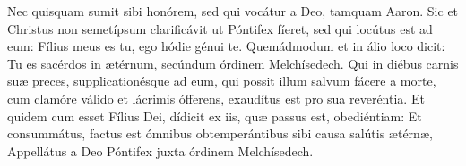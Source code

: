 
Nec quisquam sumit sibi honórem, sed qui vocátur a Deo, tamquam Aaron. Sic et
Christus non semetípsum clarificávit ut Póntifex fíeret, sed qui locútus est ad
eum: Fílius meus es tu, ego hódie génui te. Quemádmodum et in álio loco dicit:
Tu es sacérdos in ætérnum, secúndum órdinem Melchísedech. Qui in diébus carnis
suæ preces, supplicationésque ad eum, qui possit illum salvum fácere a morte,
cum clamóre válido et lácrimis ófferens, exaudítus est pro sua reveréntia. Et
quidem cum esset Fílius Dei, dídicit ex iis, quæ passus est, obediéntiam: Et
consummátus, factus est ómnibus obtemperántibus sibi causa salútis ætérnæ,
Appellátus a Deo Póntifex juxta órdinem Melchísedech.

